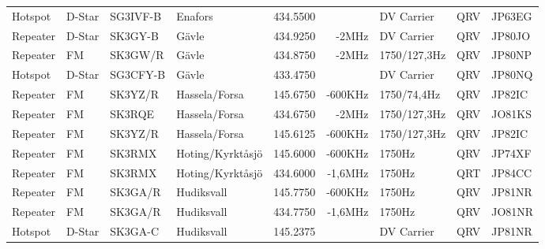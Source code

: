 \begin{landscape}
\begin{longtable}{llllrrlcl}
	Hotspot                   & D-Star        & SG3IVF-B      & Enafors             & 434.5500          &                & DV Carrier       & QRV             & JP63EG           \\
	Repeater                  & D-Star        & SK3GY-B       & Gävle               & 434.9250          & -2MHz          & DV Carrier       & QRV             & JP80JO           \\
	Repeater                  & FM            & SK3GW/R       & Gävle               & 434.8750          & -2MHz          & 1750/127,3Hz     & QRV             & JP80NP           \\
	Hotspot                   & D-Star        & SG3CFY-B      & Gävle               & 433.4750          &                & DV Carrier       & QRV             & JP80NQ           \\
	Repeater                  & FM            & SK3YZ/R       & Hassela/Forsa       & 145.6750          & -600KHz        & 1750/74,4Hz      & QRV             & JP82IC           \\
	Repeater                  & FM            & SK3RQE        & Hassela/Forsa       & 434.6750          & -2MHz          & 1750/127,3Hz     & QRV             & JO81KS           \\
	Repeater                  & FM            & SK3YZ/R       & Hassela/Forsa       & 145.6125          & -600KHz        & 1750/127,3Hz     & QRV             & JP82IC           \\
	Repeater                  & FM            & SK3RMX        & Hoting/Kyrktåsjö    & 145.6000          & -600KHz        & 1750Hz           & QRV             & JP74XF           \\
	Repeater                  & FM            & SK3RMX        & Hoting/Kyrktåsjö    & 434.6000          & -1,6MHz        & 1750Hz           & QRT             & JP84CC           \\
	Repeater                  & FM            & SK3GA/R       & Hudiksvall          & 145.7750          & -600KHz        & 1750Hz           & QRV             & JP81NR           \\
	Repeater                  & FM            & SK3GA/R       & Hudiksvall          & 434.7750          & -1,6MHz        & 1750Hz           & QRV             & JO81NR           \\
	Hotspot                   & D-Star        & SK3GA-C       & Hudiksvall          & 145.2375          &                & DV Carrier       & QRV             & JP81NR           \\

\end{longtable}
\end{landscape}
